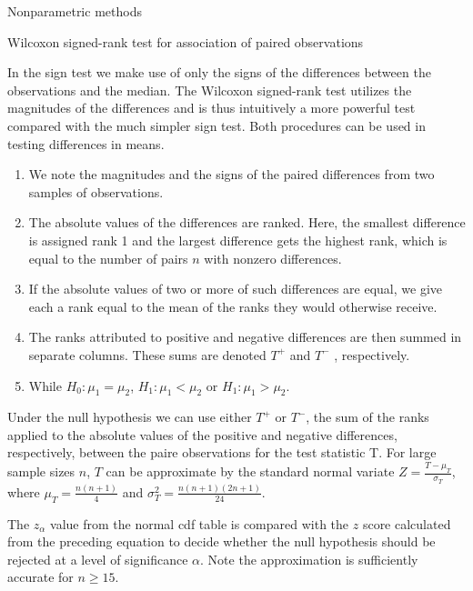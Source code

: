 \documentclass[8pt]{beamer}
\renewcommand{\emph}[1]{\textcolor{myorange}{#1}}
\begin{document}
\begin{frame}{Nonparametric methods}

    \begin{block}{Wilcoxon signed-rank test for association of paired observations}
    \end{block}
    In the \emph{sign test} we make use of only the signs of the differences between the observations and the \emph{median}. The \alert{Wilcoxon signed-rank test} utilizes the magnitudes of the differences and is thus intuitively a more powerful test compared with the much simpler \emph{sign test}. Both procedures can be used in testing differences in \emph{means}.
    \begin{enumerate}
        \item We note the magnitudes and the signs of the paired differences from two samples of observations.
        \item The absolute values of the differences are ranked. Here, the smallest difference is assigned rank 1 and the largest difference gets the highest rank, which is equal to the number of pairs $n$ with nonzero differences.
        \item If the absolute values of two or more of such differences are equal, we give each a rank equal to the mean of the ranks they would otherwise receive.
        \item The ranks attributed to positive and negative differences are then summed in separate columns. These sums are denoted $T^+$ and $T^-$ , respectively.
    \item While $H_0 : \mu_1 = \mu_2$, $H_1 : \mu_1 < \mu_2$ or $H_1 : \mu_1 > \mu_2$. 
    \end{enumerate}
    Under the \emph{null hypothesis} we can use either $T^+$ or $T^-$, the sum of the ranks applied to the absolute values of the positive and negative differences, respectively, between the paire observations for the \emph{test statistic T}. For large sample sizes $n$, $T$ can be approximate by the \emph{standard normal variate} $Z =\frac{T - \mu_T}{\sigma_T} $, where $\mu_T = \frac{n(n+1)}{4}$ and $\sigma_T^2 = \frac{n(n+1)(2n+1)}{24}$.

    The $z_{\alpha}$ value from the \emph{normal cdf} table is compared with the $z$ score calculated from   the preceding equation to decide whether the \emph{null hypothesis} should be rejected at a level of significance $\alpha$. Note the approximation is sufficiently accurate for $n \geq 15$.
    \end{frame}
\end{document}
